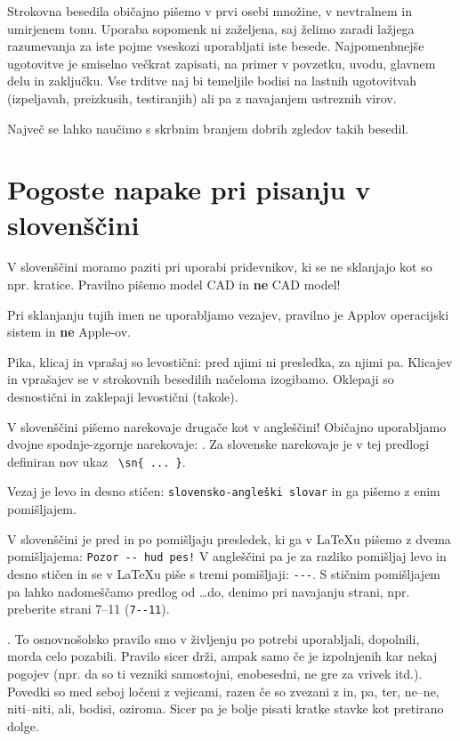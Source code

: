 \documentclass[a4paper, 12pt]{book}
\begin{document}
Strokovna besedila običajno pišemo v prvi osebi množine, v nevtralnem in umirjenem tonu. 
Uporaba sopomenk ni zaželjena, saj želimo zaradi lažjega razumevanja za iste pojme vseskozi uporabljati iste besede.
Najpomenbnejše ugotovitve je smiselno večkrat zapisati, na primer v povzetku, uvodu, glavnem delu in zaključku.
Vse trditve naj bi temeljile bodisi na lastnih ugotovitvah (izpeljavah, preizkusih, testiranjih) ali pa z navajanjem ustreznih virov.

Največ se lahko naučimo s skrbnim branjem dobrih zgledov takih besedil.


\chapter{Pogoste napake pri pisanju v slovenščini}  %
\label{slo}

V slovenščini moramo paziti  pri uporabi pridevnikov, ki se ne sklanjajo kot so npr. kratice. 
Pravilno pišemo model CAD in \textbf{ne} CAD model!

Pri sklanjanju tujih imen ne uporabljamo vezajev, pravilno je Applov operacijski sistem in \textbf{ne} Apple-ov.

Pika, klicaj in vprašaj so levostični: pred njimi ni presledka, za njimi pa. 
Klicajev in vprašajev se v strokovnih besedilih načeloma izogibamo. Oklepaji so desnostični in zaklepaji levostični (takole).

V slovenščini pišemo narekovaje drugače kot v angleščini!   
Običajno uporabljamo dvojne spodnje-zgornje narekovaje:  .
Za slovenske narekovaje je v tej predlogi definiran nov ukaz \verb+ \sn{ ... }+.

Vezaj  je levo in desno stičen: \verb=slovensko-angleški slovar= in ga pišemo z enim pomišljajem.

V slovenščini je pred in po pomišljaju presledek, ki ga v LaTeXu pišemo z dvema pomišljajema: \verb=Pozor -- hud pes!=
V angleščini pa je za razliko pomišljaj levo in desno stičen in se v LaTeXu piše s tremi  pomišljaji: \verb=---=.
S stičnim pomišljajem pa lahko nadomeščamo predlog od \dots do, denimo pri navajanju strani, npr. preberite strani 7--11 (\verb=7--11=).



. To osnovnošolsko pravilo smo v življenju po potrebi uporabljali, dopolnili, morda celo pozabili. 
Pravilo sicer drži, ampak samo če je izpolnjenih kar nekaj pogojev (npr. da so ti vezniki samostojni, enobesedni, ne gre za vrivek itd.).
Povedki so med seboj ločeni z vejicami, razen če so zvezani z in, pa, ter, ne–ne, niti–niti, ali, bodisi, oziroma.
Sicer pa je bolje pisati kratke stavke kot pretirano dolge.
\end{document}
